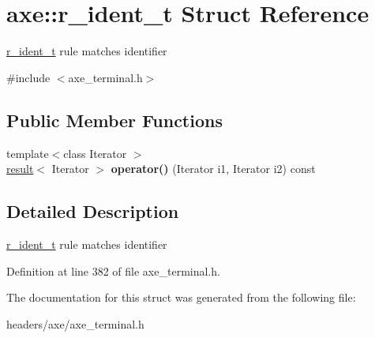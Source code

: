 \hypertarget{structaxe_1_1r__ident__t}{\section{axe\+:\+:r\+\_\+ident\+\_\+t Struct Reference}
\label{structaxe_1_1r__ident__t}
}


\hyperlink{structaxe_1_1r__ident__t}{r\+\_\+ident\+\_\+t} rule matches identifier  




{\ttfamily \#include $<$axe\+\_\+terminal.\+h$>$}

\subsection*{Public Member Functions}
\begin{DoxyCompactItemize}
\item 
\hypertarget{structaxe_1_1r__ident__t_ab7d55f28b4cfcb65803d55e631cf06f0}{{\footnotesize template$<$class Iterator $>$ }\\\hyperlink{structaxe_1_1result}{result}$<$ Iterator $>$ {\bfseries operator()} (Iterator i1, Iterator i2) const }\label{structaxe_1_1r__ident__t_ab7d55f28b4cfcb65803d55e631cf06f0}

\end{DoxyCompactItemize}


\subsection{Detailed Description}
\hyperlink{structaxe_1_1r__ident__t}{r\+\_\+ident\+\_\+t} rule matches identifier 

Definition at line 382 of file axe\+\_\+terminal.\+h.



The documentation for this struct was generated from the following file\+:\begin{DoxyCompactItemize}
\item 
headers/axe/axe\+\_\+terminal.\+h\end{DoxyCompactItemize}
